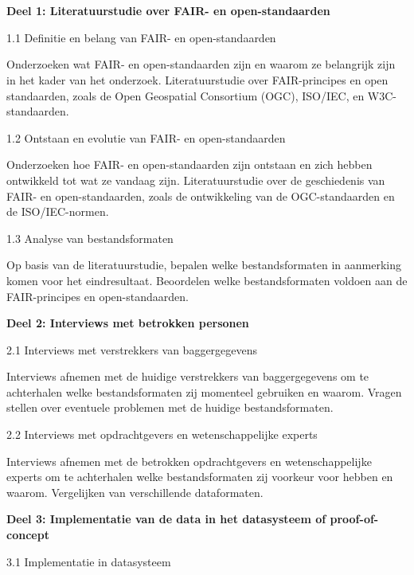 
\chapter{}%
\label{ch:methodologie}

\textbf{Deel 1: Literatuurstudie over FAIR- en open-standaarden}

1.1 Definitie en belang van FAIR- en open-standaarden

Onderzoeken wat FAIR- en open-standaarden zijn en waarom ze belangrijk zijn in het kader van het onderzoek.
Literatuurstudie over FAIR-principes en open standaarden, zoals de Open Geospatial Consortium (OGC), ISO/IEC, en W3C-standaarden.

1.2 Ontstaan en evolutie van FAIR- en open-standaarden

Onderzoeken hoe FAIR- en open-standaarden zijn ontstaan en zich hebben ontwikkeld tot wat ze vandaag zijn.
Literatuurstudie over de geschiedenis van FAIR- en open-standaarden, zoals de ontwikkeling van de OGC-standaarden en de ISO/IEC-normen.

1.3 Analyse van bestandsformaten

Op basis van de literatuurstudie, bepalen welke bestandsformaten in aanmerking komen voor het eindresultaat.
Beoordelen welke bestandsformaten voldoen aan de FAIR-principes en open-standaarden.

\textbf{Deel 2: Interviews met betrokken personen}

2.1 Interviews met verstrekkers van baggergegevens

Interviews afnemen met de huidige verstrekkers van baggergegevens om te achterhalen welke bestandsformaten zij momenteel gebruiken en waarom.
Vragen stellen over eventuele problemen met de huidige bestandsformaten.

2.2 Interviews met opdrachtgevers en wetenschappelijke experts

Interviews afnemen met de betrokken opdrachtgevers en wetenschappelijke experts om te achterhalen welke bestandsformaten zij voorkeur voor hebben en waarom.
Vergelijken van verschillende dataformaten.

\textbf{Deel 3: Implementatie van de data in het datasysteem of proof-of-concept}

3.1 Implementatie in datasysteem

